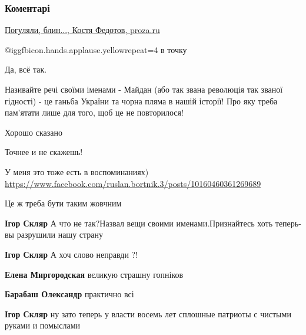  
 
 
 
 
\subsubsection{Коментарі}
\label{sec:21_11_2021.fb.bortnik_ruslan.1.maidan_revolucia_zahvat_vlasti.cmt}

\begin{itemize} %

\href{https://proza.ru/2014/11/22/985}{
Погуляли, блин..., Костя Федотов, proza.ru%
}

 @igg{fbicon.hands.applause.yellow}{repeat=4} в точку

Да, всё так.


Називайте речі своїми іменами - Майдан (або так звана революція так званої
гідності) - це ганьба України та чорна пляма в нашій історії! Про яку треба
пам’ятати лише для того, щоб це не повторилося!


Хорошо сказано

Точнее и не скажешь!

У меня это тоже есть в воспоминаниях) \url{https://www.facebook.com/ruslan.bortnik.3/posts/10160460361269689}

Це ж треба бути таким жовчним

\begin{itemize} %
\textbf{Ігор Скляр} А что не так?Назвал вещи своими именами.Признайтесь хоть теперь-вы разрушили нашу страну

\textbf{Ігор Скляр} А хоч слово неправди ?!

\textbf{Елена Миргородская} вєликую страшну гопніков

\textbf{Барабаш Олександр} практично всі

\textbf{Ігор Скляр} ну зато теперь у власти восемь лет сплошные патриоты с чистыми руками и помыслами


\end{itemize}
\end{itemize}
